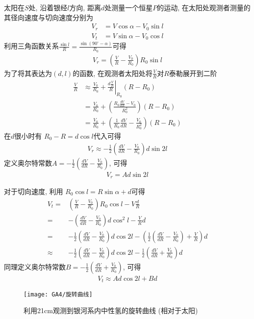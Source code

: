 太阳在$S$处, 沿着银经$l$方向, 距离$d$处测量一个恒星$P$的运动, 在太阳处观测者测量的其径向速度与切向速度分别为
\begin{align*}
    V_r&=V\cos\alpha-V_0\sin l\\
    V_t&=V\sin\alpha-V_0\cos l
\end{align*}
利用三角函数关系$\frac{\sin l}{R}=\frac{\sin(90^{\circ}-\alpha)}{R_0}$可得
\begin{align*}
    V_r=\left( \frac{V}{R}-\frac{V_0}{R_0} \right)R_0\sin l
\end{align*}
为了将其表达为$(d, l)$的函数, 在观测者太阳处将$\frac{V}{R}$对$R$泰勒展开到二阶
\begin{align*}
    \frac{V}{R}&\approx \frac{V_0}{R_0}+ \left.\frac{d\frac{V}{R}}{R}\right|_{R_0} (R-R_0) \\
    &=\frac{V_0}{R_0}+\left( \frac{R_0\frac{dV}{dR}- V_0}{R_0^2} \right)(R-R_0)  \\
    &=\frac{V_0}{R_0}+\left( \frac{1}{R_0}\frac{dV}{dR}-\frac{V_0}{R_0^2} \right)(R-R_0)
\end{align*}
在$d$很小时有 $R_0-R=d\cos l$代入可得
\begin{align*}
    V_r\approx-\frac{1}{2} \left(\frac{dV}{dR}-\frac{V_0}{R_0} \right)d\sin 2l
\end{align*}
定义奥尔特常数$\displaystyle A=-\frac{1}{2} \left(\frac{dV}{dR}-\frac{V_0}{R_0} \right)$, 可得
\begin{align*}
    V_r=Ad\sin 2l
\end{align*}

对于切向速度, 利用 $R_0\cos l=R\sin \alpha +d$可得
\begin{align*}
    V_t=&\left( \frac{V}{R}-\frac{V_0}{R_0} \right) R_0\cos l-V\frac{d}{R}\\
    =&- \left(\frac{dV}{dR}-\frac{V_0}{R_0} \right)d\cos^2 l - \frac{V}{R}d\\
    =&-\frac{1}{2} \left(\frac{dV}{dR}-\frac{V_0}{R_0} \right)d\cos 2l -\left(\frac{1}{2} \left(\frac{dV}{dR}-\frac{V_0}{R_0} \right)+ \frac{V}{R}\right) d\\
    \approx &-\frac{1}{2} \left(\frac{dV}{dR}-\frac{V_0}{R_0} \right)d\cos 2l-\frac{1}{2} \left(\frac{dV}{dR}+\frac{V_0}{R_0} \right)d
\end{align*}
同理定义奥尔特常数$\displaystyle B=-\frac{1}{2} \left(\frac{dV}{dR}+\frac{V_0}{R_0} \right) $, 可得
\begin{align*}
    V_t\approx Ad\cos2l+Bd
\end{align*}

\begin{figure}[!htb]
    \centering
    \texttt{[image: GA4/旋转曲线]}
    \caption{利用21cm观测到银河系内中性氢的旋转曲线 (相对于太阳)}
\end{figure}

